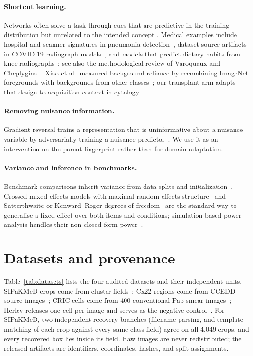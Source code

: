 \documentclass[11pt]{article}
\begin{document}
\paragraph{Shortcut learning.} Networks often solve a task through cues that are
predictive in the training distribution but unrelated to the intended concept
\citep{geirhos2020shortcut}. Medical examples include hospital and scanner signatures in
pneumonia detection~\citep{zech2018pneumonia}, dataset-source artifacts in COVID-19
radiograph models~\citep{degrave2021covid}, and models that predict dietary habits from
knee radiographs~\citep{hill2024shortcutting}; see also the methodological review of
Varoquaux and Cheplygina~\citep{varoquaux2022failures}. Xiao et al.\ measured background
reliance by recombining ImageNet foregrounds with backgrounds from other
classes~\citep{xiao2021noise}; our transplant arm adapts that design to acquisition
context in cytology.

\paragraph{Removing nuisance information.} Gradient reversal trains a representation
that is uninformative about a nuisance variable by adversarially training a nuisance
predictor~\citep{ganin2015backprop,ganin2016dann}. We use it as an intervention on the
parent fingerprint rather than for domain adaptation.

\paragraph{Variance and inference in benchmarks.} Benchmark comparisons inherit
variance from data splits and initialization~\citep{bouthillier2021variance}. Crossed
mixed-effects models with maximal random-effects structure~\citep{barr2013maximal,bates2015lme4}
and Satterthwaite or Kenward--Roger degrees of freedom~\citep{satterthwaite1946,kenward1997small,kuznetsova2017lmertest}
are the standard way to generalise a fixed effect over both items and conditions;
simulation-based power analysis handles their non-closed-form power~\citep{green2016simr}.

\section{Datasets and provenance}
\label{sec:data}



Table~\ref{tab:datasets} lists the four audited datasets and their independent units.
SIPaKMeD crops come from cluster fields~\citep{plissiti2018sipakmed}; Cx22 regions come
from CCEDD source images~\citep{liu2022cx22}; CRIC cells come from 400 conventional Pap
smear images~\citep{rezende2021cric}; Herlev releases one cell per image and serves as the
negative control~\citep{jantzen2005pap}. For SIPaKMeD, two independent recovery branches
(filename parsing, and template matching of each crop against every same-class field)
agree on all 4,049 crops, and every recovered box lies inside its field. Raw images are
never redistributed; the released artifacts are identifiers, coordinates, hashes, and
split assignments.
\end{document}

